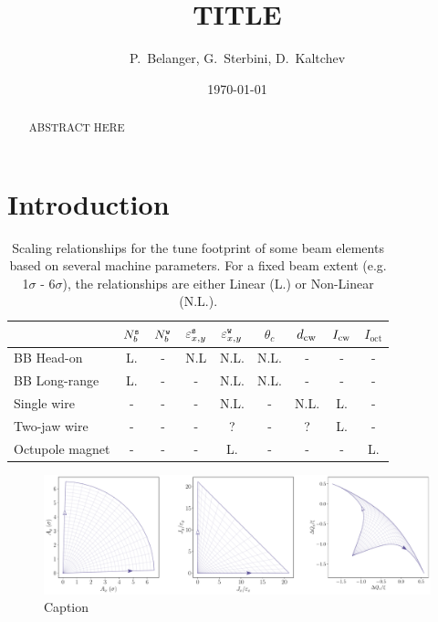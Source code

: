 \documentclass{cernatsnote}
\title{TITLE}
\author{P.~Belanger, G.~Sterbini, D.~Kaltchev}
\date{\today}
\newcommand{\weak}{{\texttt{\scriptsize w}}}
\newcommand{\strong}{{\texttt{\scriptsize s}}}
\newcommand{\wire}{{\text{\scriptsize cw}}}
\begin{document}
\maketitle

\begin{abstract}
ABSTRACT HERE
\end{abstract}



\section{Introduction}



\begin{table}[h!]
\captionsetup{width=.9\linewidth}
\caption{Scaling relationships for the tune footprint of some beam elements based on several machine parameters. For a fixed beam extent {(e.g. 1$\sigma$ - $6\sigma$)}, the relationships are either Linear (L.) or Non-Linear (N.L.).}
\centering
\begin{adjustbox}{max width=\linewidth}
\begin{tabular}{lcccccccc}
\toprule
        & $N_b^\strong$ & $N_b^\weak$ & $\varepsilon_{x,y}^\strong$ & $\varepsilon_{x,y}^\weak$ & $\theta_c$ & $d_\wire$ & $I_\wire$ & $I_\text{oct}$$$\\
\toprule
BB Head-on      &   L.   &   -   &   N.L     &   N.L.     &   N.L.  &   -   &   -   &   -  \\
BB Long-range   &   L.   &   -   &   -       &   N.L.     &   N.L.  &   -   &   -   &   -  \\
Single wire     &   -    &   -   &   -       &   N.L.     &   -     &   N.L.&   L.  &   -  \\
Two-jaw wire    &   -    &   -   &   -       &   ?        &   -     &   ?   &   L.  &   -  \\
Octupole magnet &   -    &   -   &   -       &   L.       &   -     &   -   &   -   &   L.  \\


\bottomrule
\end{tabular}
\label{tab:dust_charge_example}
\end{adjustbox}
\end{table}

\pagebreak

\begin{figure}[h!]
    \centering
    \includegraphics[width=\linewidth]{TeX/Figures/Mapping_explained.pdf}
    \caption{Caption}
    \label{fig:my_label}
\end{figure}
\end{document}
